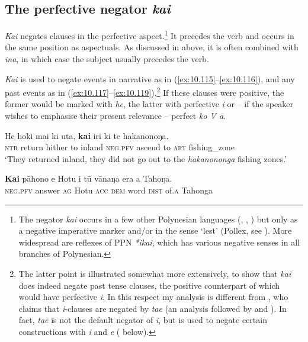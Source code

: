 \subsection{The perfective negator \textit{kai}}\label{sec:10.5.3}

\textit{Kai} negates clauses in the perfective aspect.\footnote{\label{fn:497}The negator \textit{kai} occurs in a few other Polynesian languages (, , ) but only as a negative imperative marker and/or in the sense ‘lest’ (Pollex, see \citealt{GreenhillClark2011}). More widespread are reflexes of PPN \textit{*{\ꞌ}ikai}, which has various negative senses in all branches of Polynesian.} It precedes the verb and occurs in the same position as aspectuals. As discussed in  above, it is often combined with \textit{{\ꞌ}ina}, in which case the subject usually precedes the verb. 

\textit{Kai} is used to negate events in narrative as in (\ref{ex:10.115}–\ref{ex:10.116}), and any past events as in (\ref{ex:10.117}–\ref{ex:10.119}).\footnote{\label{fn:498}The latter point is illustrated somewhat more extensively, to show that \textit{kai} does indeed negate past tense clauses, the positive counterpart of which would have perfective \textit{i}. In this respect my analysis is different from \citet[79]{Englert1978}, who claims that \textit{i}{}-clauses are negated by \textit{ta{\ꞌ}e} (an analysis followed by \citealt[158]{Chapin1978} and \citealt[157]{Stenson1981}). In fact, \textit{ta{\ꞌ}e} is not the default negator of \textit{i}, but is used to negate certain constructions with \textit{i} and \textit{e} ( below).} If these clauses were positive, the former would be marked with \textit{he}, the latter with perfective \textit{i} or – if the speaker wishes to emphasise their present relevance – perfect \textit{ko V {\ꞌ}ā}.

\ea\label{ex:10.115}
\gll He hoki mai ki {\ꞌ}uta, \textbf{kai} iri ki te hakanonoŋa. \\
\textsc{ntr} return hither to inland \textsc{neg.pfv} ascend to \textsc{art} fishing\_zone \\

\glt 
‘They returned inland, they did not go out to the \textit{hakanononga} fishing zones.’ \textstyleExampleref{[Ley-6-43.031]}
\z

\ea\label{ex:10.116}
\gll \textbf{Kai} pāhono e Hotu i tū vānaŋa era {\ꞌ}a Tahoŋa. \\
\textsc{neg.pfv} answer \textsc{ag} Hotu \textsc{acc} \textsc{dem} word \textsc{dist} of\textsc{.a} Tahonga \\

